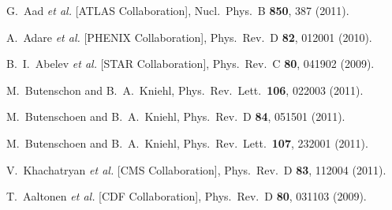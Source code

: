 \documentclass[article,showpacs,preprintnumbers,amsmath,amssymb]{revtex4}
\begin{document}
\begin{thebibliography}{80}
  G.~Aad {\it et al.}  [ATLAS Collaboration],
  Nucl.\ Phys.\  B {\bf 850}, 387 (2011).

  A.~Adare {\it et al.}  [PHENIX Collaboration],
  Phys.\ Rev.\  D {\bf 82}, 012001 (2010).

  B.~I.~Abelev {\it et al.}  [STAR Collaboration],
  Phys.\ Rev.\  C {\bf 80}, 041902 (2009).

  M.~Butenschon and B.~A.~Kniehl,
  Phys.\ Rev.\ Lett.\  {\bf 106}, 022003 (2011).

  M.~Butenschoen and B.~A.~Kniehl,
  Phys.\ Rev.\  D {\bf 84}, 051501 (2011).

  M.~Butenschoen and B.~A.~Kniehl,
  Phys.\ Rev.\ Lett.\  {\bf 107}, 232001 (2011).


  V.~Khachatryan {\it et al.}  [CMS Collaboration],
  Phys.\ Rev.\  D {\bf 83}, 112004 (2011).

  T.~Aaltonen {\it et al.}  [CDF Collaboration],
  Phys.\ Rev.\ D {\bf 80}, 031103 (2009).


\end{thebibliography}
\end{document}
